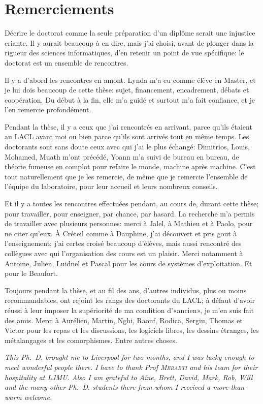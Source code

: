 \chapter{Remerciements}

Décrire le doctorat comme la seule préparation d'un diplôme serait une injustice criante.
Il y aurait beaucoup à en dire, mais j'ai choisi, avant de plonger dans la rigueur des sciences informatiques, d'en retenir un point de vue spécifique: le doctorat est un ensemble de rencontres.

Il y a d'abord les rencontres en amont.
Lynda m'a eu comme élève en Master, et je lui dois beaucoup de cette thèse: sujet, financement, encadrement, débats et coopération.
Du début à la fin, elle m'a guidé et surtout m'a fait confiance, et je l'en remercie profondément.

Pendant la thèse, il y a ceux que j'ai rencontrés en arrivant, parce qu'ils étaient au LACL avant moi ou bien parce qu'ils sont arrivés tout en même temps.
Les doctorants sont sans doute ceux avec qui j'ai le plus échangé: Dimitrios, Louis, Mohamed, Muath m'ont précédé, Yoann m'a suivi de bureau en bureau, de théorie fumeuse en complot pour refaire le monde, machine après machine.
C'est tout naturellement que je les remercie, de même que je remercie l'ensemble de l'équipe du laboratoire, pour leur accueil et leurs nombreux conseils.

Et il y a toutes les rencontres effectuées pendant, au cours de, durant cette thèse; pour travailler, pour enseigner, par chance, par hasard.
La recherche m'a permis de travailler avec plusieurs personnes: merci à Jalel, à Mathieu et à Paolo, pour ne citer qu'eux.
À Créteil comme à Dauphine, j'ai découvert et pris gout à l'enseignement; j'ai certes croisé beaucoup d'élèves, mais aussi rencontré des collègues avec qui l'organisation des cours est un plaisir.
Merci notamment à Antoine, Julien, Luidnel et Pascal pour les cours de systèmes d'exploitation.
Et pour le Beaufort.

Toujours pendant la thèse, et au fil des ans, d'autres individus, plus ou moins recommandables, ont rejoint les rangs des doctorants du LACL; à défaut d'avoir réussi à leur imposer la supériorité de ma condition d'«ancien», je m'en suis fait des amis.
Merci à Aurélien, Martin, Nghi, Raouf, Rodica, Sergiu, Thomas et Victor pour les repas et les discussions, les logiciels libres, les dessins étranges, les métalangages et les comorphismes.
Entre autres choses.

\vfil
\begin{english}
{\it
This Ph.~D. brought me to Liverpool for two months, and I was lucky enough to meet wonderful people there.
I have to thank Prof \textsc{Merabti} and his team for their hospitality at LJMU.
Also I am grateful to Aíne, Brett, David, Mark, Rob, Will and the many other Ph.~D. students there from whom I received a more-than-warm welcome.
}
\end{english}
\vfil

